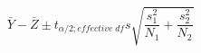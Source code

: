 

\[
\bar{Y} - \bar{Z} \pm t_{\alpha/2;effective \; df} s\sqrt{\frac{s_1^2}{N_1} + \frac{s_2^2} {N_2}}
\]


